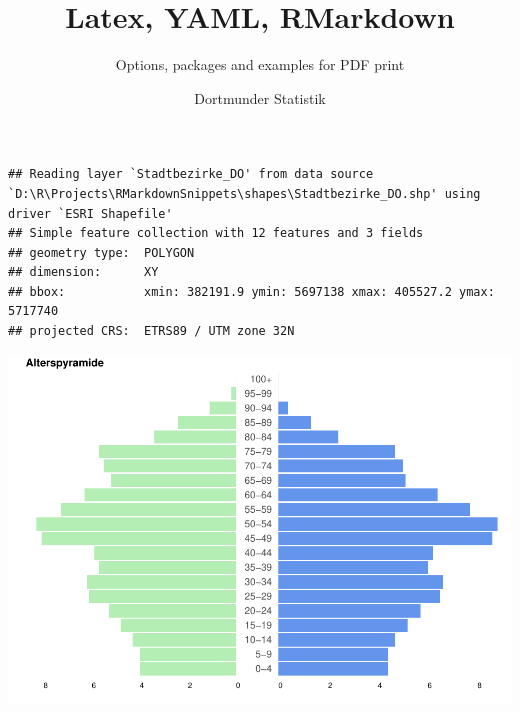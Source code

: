 \documentclass[
  a4paper,
  twoside]{article}
\title{Latex, YAML, RMarkdown}
\subtitle{Options, packages and examples for PDF print}
\author{Dortmunder Statistik}
\date{}
\begin{document}
\maketitle

{
\hypersetup{linkcolor=}
\setcounter{tocdepth}{4}
\tableofcontents
}
\begin{verbatim}
## Reading layer `Stadtbezirke_DO' from data source `D:\R\Projects\RMarkdownSnippets\shapes\Stadtbezirke_DO.shp' using driver `ESRI Shapefile'
## Simple feature collection with 12 features and 3 fields
## geometry type:  POLYGON
## dimension:      XY
## bbox:           xmin: 382191.9 ymin: 5697138 xmax: 405527.2 ymax: 5717740
## projected CRS:  ETRS89 / UTM zone 32N
\end{verbatim}

\includegraphics[width=1\linewidth]{2021-03-02_Beispiel_files/figure-latex/unnamed-chunk-2-1}
\end{document}
